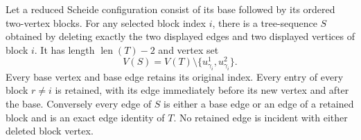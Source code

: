 \begin{helper}
Let a reduced Scheide configuration consist of its base followed by its
ordered two-vertex blocks.  For any selected block index $i$, there is a
tree-sequence $S$ obtained by deleting exactly the two displayed edges
and two displayed vertices of block $i$.  It has length
$\operatorname{len}(T)-2$ and vertex set
\[
 V(S)=V(T)\setminus
 \{u^1_{\gamma_i},u^2_{\gamma_i}\}.
\]
Every base vertex and base edge retains its original index.  Every entry
of every block $r\ne i$ is retained, with its edge immediately before its
new vertex and after the base.  Conversely every edge of $S$ is either a
base edge or an edge of a retained block and is an exact edge
identity of $T$.  No retained edge is incident with either deleted block
vertex.
\end{helper}
